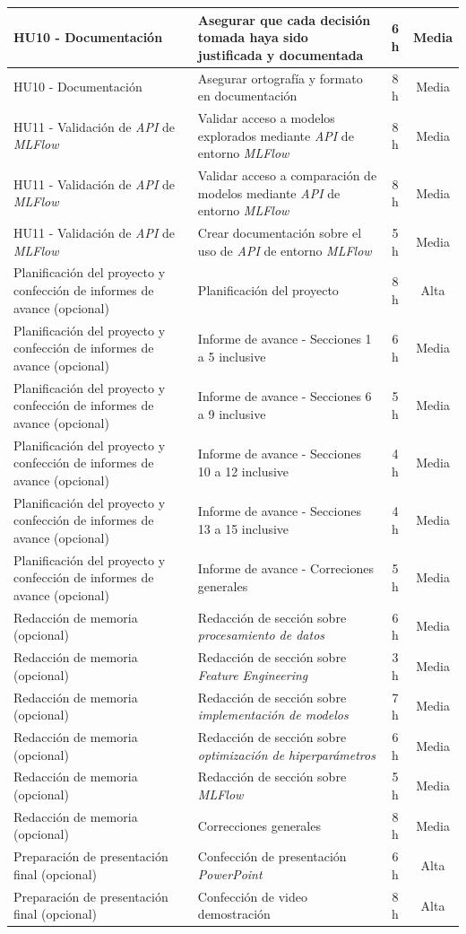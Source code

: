 \documentclass[
11pt, %
]{charter}
\begin{document}
\begin{xltabular}{\linewidth}{@{}|X|X|c|c|@{}}
HU10 - Documentación & Asegurar que cada decisión tomada haya sido justificada y documentada & 6 h & Media \\ \hline
HU10 - Documentación & Asegurar ortografía y formato en documentación & 8 h & Media \\ \hline
HU11 - Validación de \textit{API} de \textit{MLFlow} & Validar acceso a modelos explorados mediante \textit{API} de entorno \textit{MLFlow} & 8 h & Media \\ \hline
HU11 - Validación de \textit{API} de \textit{MLFlow} & Validar acceso a comparación de modelos mediante \textit{API} de entorno \textit{MLFlow} & 8 h & Media \\ \hline
HU11 - Validación de \textit{API} de \textit{MLFlow} & Crear documentación sobre el uso de \textit{API} de entorno \textit{MLFlow} & 5 h & Media \\ \hline
Planificación del proyecto y confección de informes de avance (opcional) & Planificación del proyecto & 8 h & Alta \\ \hline
Planificación del proyecto y confección de informes de avance (opcional) & Informe de avance - Secciones 1 a 5 inclusive & 6 h & Media \\ \hline
Planificación del proyecto y confección de informes de avance (opcional) & Informe de avance - Secciones 6 a 9 inclusive & 5 h & Media \\ \hline
Planificación del proyecto y confección de informes de avance (opcional) & Informe de avance - Secciones 10 a 12 inclusive & 4 h & Media \\ \hline
Planificación del proyecto y confección de informes de avance (opcional) & Informe de avance - Secciones 13 a 15 inclusive & 4 h & Media \\ \hline
Planificación del proyecto y confección de informes de avance (opcional) & Informe de avance - Correciones generales & 5 h & Media \\ \hline
Redacción de memoria (opcional) & Redacción de sección sobre \textit{procesamiento de datos} & 6 h & Media \\ \hline
Redacción de memoria (opcional) & Redacción de sección sobre \textit{Feature Engineering} & 3 h & Media \\ \hline
Redacción de memoria (opcional) & Redacción de sección sobre \textit{implementación de modelos} & 7 h & Media \\ \hline
Redacción de memoria (opcional) & Redacción de sección sobre \textit{optimización de hiperparámetros} & 6 h & Media \\ \hline
Redacción de memoria (opcional) & Redacción de sección sobre \textit{MLFlow} & 5 h & Media \\ \hline
Redacción de memoria (opcional) & Correcciones generales & 8 h & Media \\ \hline
Preparación de presentación final (opcional) & Confección de presentación \textit{PowerPoint} & 6 h & Alta \\ \hline
Preparación de presentación final (opcional) & Confección de video demostración & 8 h & Alta \\ \hline
\end{xltabular}
\end{document}
